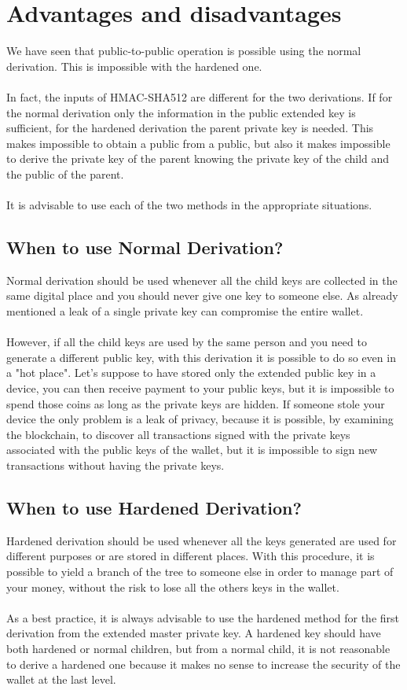 \section{Advantages and disadvantages}
We have seen that public-to-public operation is possible using the normal derivation. This is impossible with the hardened one.
\\ \\
In fact, the inputs of HMAC-SHA512 are different for the two derivations. If for the normal derivation only the information in the public extended key is sufficient, for the hardened derivation the parent private key is needed. This makes impossible to obtain a public from a public, but also it makes impossible to derive the private key of the parent knowing the private key of the child and the public of the parent.
\\ \\
It is advisable to use each of the two methods in the appropriate situations.

\subsection{When to use Normal Derivation?}
Normal derivation should be used whenever all the child keys are collected in the same digital place and you should never give one key to someone else. As already mentioned a leak of a single private key can compromise the entire wallet.
\\ \\
However, if all the child keys are used by the same person and you need to generate a different public key, with this derivation it is possible to do so even in a "hot place". Let's suppose to have stored only the extended public key in a device, you can then receive payment to your public keys, but it is impossible to spend those coins as long as the private keys are hidden. If someone stole your device the only problem is a leak of privacy, because it is possible, by examining the blockchain, to discover all transactions signed with the private keys associated with the public keys of the wallet, but it is impossible to sign new transactions without having the private keys.


\subsection{When to use Hardened Derivation?}
Hardened derivation should be used whenever all the keys generated are used for different purposes or are stored in different places. With this procedure, it is possible to yield a branch of the tree to someone else in order to manage part of your money, without the risk to lose all the others keys in the wallet.
\\ \\
As a best practice, it is always advisable to use the hardened method for the first derivation from the extended master private key. A hardened key should have both hardened or normal children, but from a normal child, it is not reasonable to derive a hardened one because it makes no sense to increase the security of the wallet at the last level.


